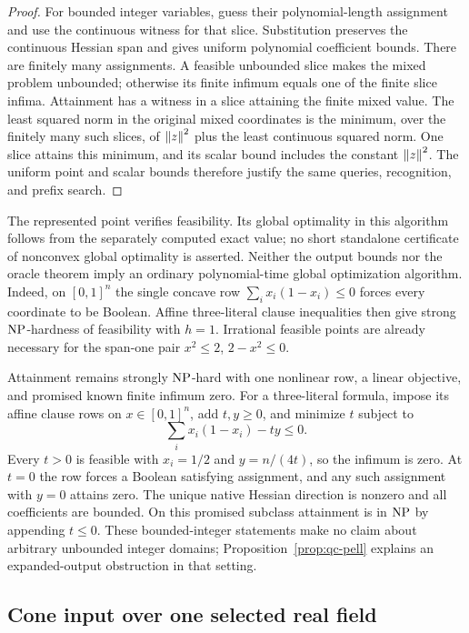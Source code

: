 \begin{proof}
For bounded integer variables, guess their polynomial-length assignment
and use the continuous witness for that slice. Substitution preserves the
continuous Hessian span and gives uniform polynomial coefficient bounds.
There are finitely many assignments. A feasible unbounded slice makes the
mixed problem unbounded; otherwise its finite infimum equals one of the
finite slice infima. Attainment has a witness in a slice attaining the
finite mixed value. The least squared norm in the original mixed
coordinates is the minimum, over the finitely many such slices, of
$\left\lVert z\right\rVert^2$ plus the least continuous squared norm. One slice attains
this minimum, and its scalar bound includes the constant $\left\lVert z\right\rVert^2$.
The uniform point and scalar bounds therefore
justify the same queries, recognition, and prefix search.
\end{proof}

The represented point verifies feasibility. Its global optimality in this
algorithm follows from the separately computed exact value; no short
standalone certificate of nonconvex global optimality is asserted.
Neither the output bounds nor the oracle theorem imply an ordinary
polynomial-time global optimization algorithm. Indeed, on $[0,1]^n$ the
single concave row $\sum_i x_i(1-x_i)\le0$ forces every coordinate to
be Boolean. Affine three-literal clause inequalities then give strong
$\mathrm{NP}$-hardness of feasibility with $h=1$. Irrational feasible points
are already necessary for the span-one pair $x^2\le2$, $2-x^2\le0$.

Attainment remains strongly $\mathrm{NP}$-hard with one nonlinear row, a linear
objective, and promised known finite infimum zero. For a three-literal
formula, impose its affine clause rows on $x\in[0,1]^n$, add $t,y\ge0$,
and minimize $t$ subject to
\[
 \sum_i x_i(1-x_i)-ty\le0.
\]
Every $t>0$ is feasible with $x_i=1/2$ and $y=n/(4t)$, so the infimum
is zero. At $t=0$ the row forces a Boolean satisfying assignment, and any
such assignment with $y=0$ attains zero. The unique native Hessian
direction is nonzero and all coefficients are bounded. On this promised
subclass attainment is in $\mathrm{NP}$ by appending $t\le0$.
These bounded-integer statements make no claim about arbitrary unbounded
integer domains; Proposition~\ref{prop:qc-pell} explains an expanded-output
obstruction in that setting.

\subsection{Cone input over one selected real field}
\label{app:cone-setting}

